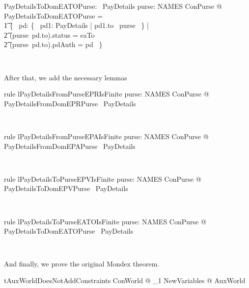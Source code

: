 %
\begin{LNewADef}
\begin{axdef}
   PayDetailsToDomEATOPurse: \power~PayDetails
\where
    \forall purse: NAMES \finj ConPurse @ PayDetailsToDomEATOPurse = \\
    \t1 \{~ pd: \{~ pd1: PayDetails | pd1.to \in \dom~purse ~\} | \\
        \t2 (purse~pd.to).status = eaTo \land \\
        \t2 (purse~pd.to).pdAuth = pd ~\}
\end{axdef}~\end{LNewADef}
%
After that, we add the necessary lemmas
%
\begin{LNewLemma}
\begin{theorem}{rule lPayDetailsFromPurseEPRIsFinite}
    \forall purse: NAMES \finj ConPurse @ PayDetailsFromDomEPRPurse \in \finset~PayDetails
\end{theorem}~\end{LNewLemma}

\begin{LNewLemma}
\begin{theorem}{rule lPayDetailsFromPurseEPAIsFinite}
    \forall purse: NAMES \finj ConPurse @ PayDetailsFromDomEPAPurse \in \finset~PayDetails
\end{theorem}~\end{LNewLemma}

\begin{LNewLemma}
\begin{theorem}{rule lPayDetailsToPurseEPVIsFinite}
    \forall purse: NAMES \finj ConPurse @ PayDetailsToDomEPVPurse \in \finset~PayDetails
\end{theorem}~\end{LNewLemma}

\begin{LNewLemma}
\begin{theorem}{rule lPayDetailsToPurseEATOIsFinite}
    \forall purse: NAMES \finj ConPurse @ PayDetailsToDomEATOPurse \in \finset~PayDetails
\end{theorem}~\end{LNewLemma}
%
And finally, we prove the original Mondex theorem.
%
\begin{LThm} %
\begin{theorem}{tAuxWorldDoesNotAddConstraints}
   \forall ConWorld @ \exists_1 NewVariables @ AuxWorld
\end{theorem}~\end{LThm}

